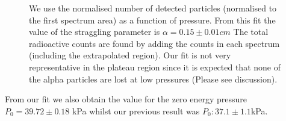 \documentclass[a4paper]{article}
\begin{document}
\begin{figure}
\caption{
We use the normalised number of detected particles (normalised to the first spectrum area) as a function of pressure.
From this fit the value of the straggling parameter is $\alpha = 0.15 \pm 0.01 cm$ 
The total radioactive counts are found by adding the counts in each spectrum (including the extrapolated region). Our fit is not very representative in the plateau region since it is expected that none of the alpha particles are lost at low pressures (Please see discussion). 
}
\end{figure}


\clearpage
From our fit we also obtain the value for the zero energy pressure $P_0 = 39.72 \pm 0.18$ kPa whilst our previous result was $P_0: 37.1 \pm 1.1$kPa.
\end{document}
